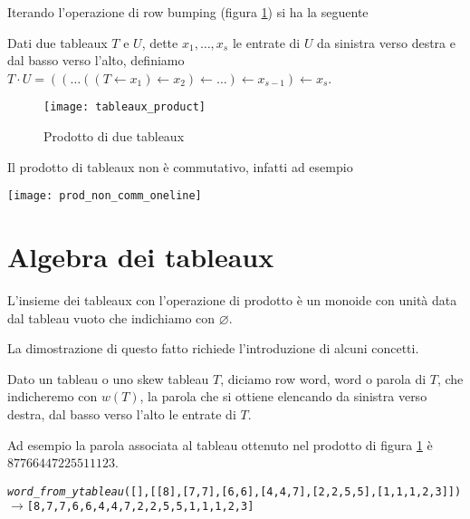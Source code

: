Iterando l'operazione di row bumping (figura \ref{fig:tab_prod}) si ha la seguente

\begin{defn}
Dati due tableaux $T$ e $U$, dette $x_1,\ldots , x_s$ le entrate di
$U$ da sinistra verso destra e dal basso verso l'alto, definiamo
$T \cdot U = (( \ldots ((T \gets x_1) \gets x_2 ) \gets \ldots ) \gets x_{s-1} )
\gets x_s$.
\end{defn} 

\begin{figure}[h]
\centering
\texttt{[image: tableaux\_product]}
\caption{Prodotto di due tableaux}
\label{fig:tab_prod}
\end{figure}

\begin{oss}
Il prodotto di tableaux non \`e commutativo, infatti ad esempio
\begin{center}
\texttt{[image: prod\_non\_comm\_oneline]}
\end{center}
\end{oss}

\section{Algebra dei tableaux}

\begin{prop}\label{tableaux_monoid}
L'insieme dei tableaux con l'operazione di prodotto \`e un monoide con
unit\`a data dal tableau vuoto che indichiamo con $\varnothing$.
\end{prop}

La dimostrazione di questo fatto richiede l'introduzione di alcuni
concetti.

\begin{defn}[Parola]
Dato un tableau o uno skew tableau $T$, diciamo row word, word o parola
di $T$, che indicheremo con $w(T)$, la parola che si ottiene elencando
da sinistra verso destra, dal basso verso l'alto le entrate di $T$.
\end{defn}

Ad esempio la parola associata al tableau ottenuto nel prodotto di
figura \ref{fig:tab_prod} \`e $87766447225511123$.

\begin{alltt}
\emph{word\_from\_ytableau} ([],[[8],[7,7],[6,6],[4,4,7],[2,2,5,5],[1,1,1,2,3]])
\(\rightarrow\) [8,7,7,6,6,4,4,7,2,2,5,5,1,1,1,2,3]
\end{alltt}

